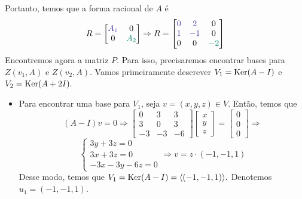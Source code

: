 \documentclass[11pt,a4paper]{article}
\begin{document}
{Portanto, temos que a forma racional de $A$ é
\[
R = \begin{bmatrix}
\textcolor{Violet}{A_1} & 0 \\ 0 & \textcolor{PineGreen}{A_2}
\end{bmatrix} \Rightarrow R = \begin{bmatrix}
\textcolor{Violet}{0} & \textcolor{Violet}{2} & 0 \\ \textcolor{Violet}{1} & \textcolor{Violet}{-1} & 0 \\
0 & 0 & \textcolor{PineGreen}{-2}
\end{bmatrix} 
\]
Encontremos agora a matriz $P.$ Para isso, precisaremos encontrar bases para $Z(v_1, A)$ e $Z(v_2, A).$ 
Vamos primeiramente descrever $V_1 = \operatorname{Ker}(A - I)$ e $V_2 = \operatorname{Ker}(A + 2I).$ 
\begin{itemize}
    \item Para encontrar uma base para $V_1$, seja $v = (x, y, z) \in V.$ Então, temos que
    \[
    (A - I)v = 0 \Rightarrow \begin{bmatrix}
0 & 3 & 3 \\
3 & 0 & 3 \\
-3 & -3 & -6
\end{bmatrix} \begin{bmatrix}
x \\ y \\ z
\end{bmatrix} = \begin{bmatrix}
0 \\ 0 \\ 0
\end{bmatrix} \Rightarrow \]\[\begin{cases}
3y + 3z = 0 \\
3x+3z = 0 \\
-3x-3y-6z = 0
\end{cases} \Rightarrow v = z \cdot (-1,-1,1)
    \]
    Desse modo, temos que $V_1 = \operatorname{Ker}(A - I) = \langle (-1,-1,1) \rangle.$ Denotemos $u_1 = (-1,-1,1).$


\end{itemize}}
\end{document}
